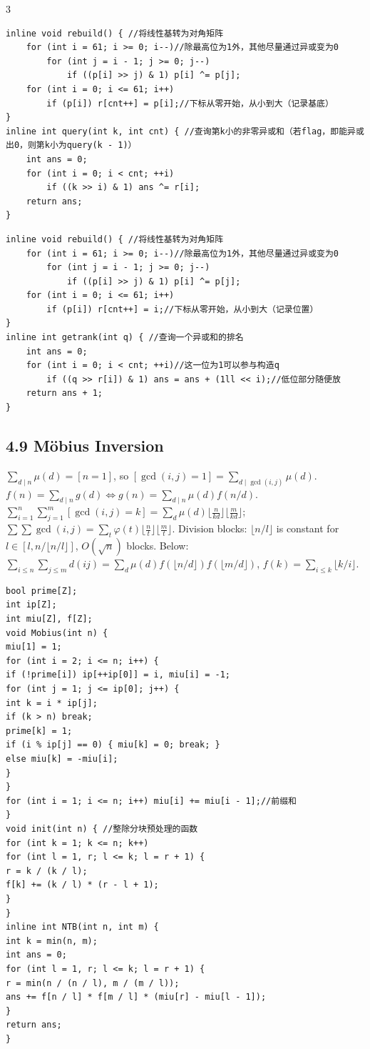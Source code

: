 \documentclass[8pt]{extarticle}
\begin{document}
\begin{multicols*}{3}
\begin{lstlisting}
inline void rebuild() { //将线性基转为对角矩阵
    for (int i = 61; i >= 0; i--)//除最高位为1外，其他尽量通过异或变为0
        for (int j = i - 1; j >= 0; j--)
            if ((p[i] >> j) & 1) p[i] ^= p[j];
    for (int i = 0; i <= 61; i++)
        if (p[i]) r[cnt++] = p[i];//下标从零开始，从小到大（记录基底）
}
inline int query(int k, int cnt) { //查询第k小的非零异或和（若flag，即能异或出0，则第k小为query(k - 1)）
    int ans = 0;
    for (int i = 0; i < cnt; ++i)
        if ((k >> i) & 1) ans ^= r[i];
    return ans;
}
\end{lstlisting}

\begin{lstlisting}
inline void rebuild() { //将线性基转为对角矩阵
    for (int i = 61; i >= 0; i--)//除最高位为1外，其他尽量通过异或变为0
        for (int j = i - 1; j >= 0; j--)
            if ((p[i] >> j) & 1) p[i] ^= p[j];
    for (int i = 0; i <= 61; i++)
        if (p[i]) r[cnt++] = i;//下标从零开始，从小到大（记录位置）
}
inline int getrank(int q) { //查询一个异或和的排名
    int ans = 0;
    for (int i = 0; i < cnt; ++i)//这一位为1可以参与构造q
        if ((q >> r[i]) & 1) ans = ans + (1ll << i);//低位部分随便放
    return ans + 1;
}
\end{lstlisting}

\subsection*{4.9 Möbius Inversion}

$\sum_{d \mid n}\mu(d) = [n = 1]$, so $[\gcd(i, j) = 1] = \sum_{d \mid \gcd(i,j)} \mu(d)$. $f(n) = \sum_{d \mid n} g(d) \iff g(n) = \sum_{d \mid n} \mu(d) f(n/d)$. $\sum_{i=1}^{n}\sum_{j=1}^{m}[\gcd(i,j) = k] = \sum_{d} \mu(d) \lfloor \frac{n}{kd} \rfloor \lfloor \frac{m}{kd} \rfloor$; $\sum\sum \gcd(i,j) = \sum_t \varphi(t) \lfloor \frac nt \rfloor \lfloor \frac mt \rfloor$. Division blocks: $\lfloor n/l \rfloor$ is constant for $l \in [l, n / \lfloor n/l \rfloor]$, $O(\sqrt n)$ blocks. Below: $\sum_{i \le n}\sum_{j \le m} d(ij) = \sum_d \mu(d) f(\lfloor n/d \rfloor) f(\lfloor m/d \rfloor)$, $f(k) = \sum_{i \le k} \lfloor k/i \rfloor$.


\begin{lstlisting}
bool prime[Z];
int ip[Z];
int miu[Z], f[Z];
void Mobius(int n) {
miu[1] = 1;
for (int i = 2; i <= n; i++) {
if (!prime[i]) ip[++ip[0]] = i, miu[i] = -1;
for (int j = 1; j <= ip[0]; j++) {
int k = i * ip[j];
if (k > n) break;
prime[k] = 1;
if (i % ip[j] == 0) { miu[k] = 0; break; }
else miu[k] = -miu[i];
}
}
for (int i = 1; i <= n; i++) miu[i] += miu[i - 1];//前缀和
}
void init(int n) { //整除分块预处理的函数
for (int k = 1; k <= n; k++)
for (int l = 1, r; l <= k; l = r + 1) {
r = k / (k / l);
f[k] += (k / l) * (r - l + 1);
}
}
inline int NTB(int n, int m) {
int k = min(n, m);
int ans = 0;
for (int l = 1, r; l <= k; l = r + 1) {
r = min(n / (n / l), m / (m / l));
ans += f[n / l] * f[m / l] * (miu[r] - miu[l - 1]);
}
return ans;
}
\end{lstlisting}


\end{multicols*}
\end{document}
